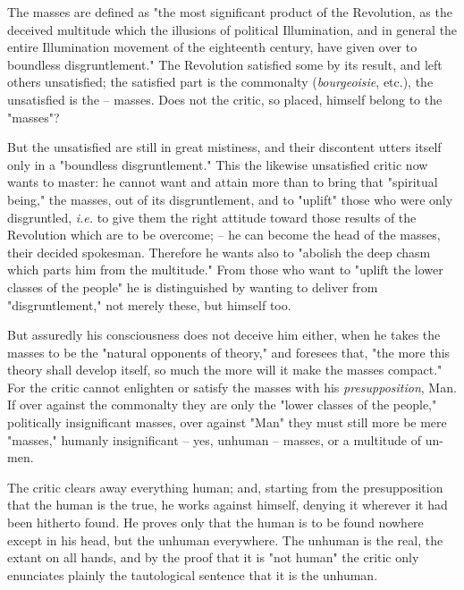 The masses are defined as "{}the most significant product of the Revolution, 
as the deceived multitude which the illusions of political Illumination, and 
in general the entire Illumination movement of the eighteenth century, have 
given over to boundless disgruntlement."{} The Revolution satisfied some by 
its result, and left others unsatisfied; the satisfied part is the commonalty 
(\textit{bourgeoisie}, etc.), the unsatisfied is the -- masses. Does not the 
critic, so placed, himself belong to the "{}masses"{}?

But the unsatisfied are still in great mistiness, and their discontent utters 
itself only in a "{}boundless disgruntlement."{} This the likewise unsatisfied 
critic now wants to master: he cannot want and attain more than to bring that 
"{}spiritual being,"{} the masses, out of its disgruntlement, and to 
"{}uplift"{} those who were only disgruntled, \textit{i.e.} to give them the 
right attitude toward those results of the Revolution which are to be 
overcome; -- he can become the head of the masses, their decided spokesman. 
Therefore he wants also to "{}abolish the deep chasm which parts him from the 
multitude."{} From those who want to "{}uplift the lower classes of the 
people"{} he is distinguished by wanting to deliver from "{}disgruntlement,"{} 
not merely these, but himself too.

But assuredly his consciousness does not deceive him either, when he takes the 
masses to be the "{}natural opponents of theory,"{} and foresees that, "{}the 
more this theory shall develop itself, so much the more will it make the 
masses compact."{} For the critic cannot enlighten or satisfy the masses with 
his \textit{presupposition}, Man. If over against the commonalty they are only 
the "{}lower classes of the people,"{} politically insignificant masses, over 
against "{}Man"{} they must still more be mere "{}masses,"{} humanly 
insignificant -- yes, unhuman -- masses, or a multitude of un-men.

The critic clears away everything human; and, starting from the presupposition 
that the human is the true, he works against himself, denying it wherever it 
had been hitherto found. He proves only that the human is to be found nowhere 
except in his head, but the unhuman everywhere. The unhuman is the real, the 
extant on all hands, and by the proof that it is "{}not human"{} the critic 
only enunciates plainly the tautological sentence that it is the unhuman.

